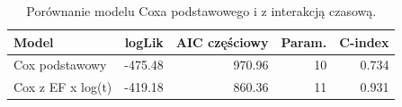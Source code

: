 \begin{table}[htbp]
\centering
\caption{Porównanie modelu Coxa podstawowego i z interakcją czasową.}
\label{tab:cox-time}
\small
\setlength{\tabcolsep}{2.4pt}
\begin{tabular*}{.98\linewidth}{@{\extracolsep{\fill}}lrrrr}
\toprule
Model & logLik & AIC częściowy & Param. & C-index \\
\midrule
Cox podstawowy & -475.48 & 970.96 & 10 & 0.734 \\
Cox z EF x log(t) & -419.18 & 860.36 & 11 & 0.931 \\
\bottomrule
\end{tabular*}
\end{table}
